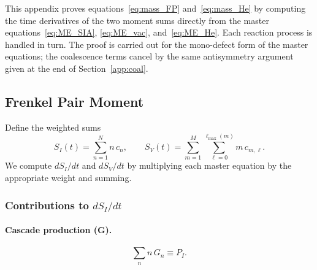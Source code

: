 This appendix proves equations~\eqref{eq:mass_FP} and~\eqref{eq:mass_He}
by computing the time derivatives of the two moment sums directly from the
master equations~\eqref{eq:ME_SIA}, \eqref{eq:ME_vac}, and~\eqref{eq:ME_He}.
Each reaction process is handled in turn. The proof is carried out for the
mono-defect form of the master equations; the coalescence terms cancel
by the same antisymmetry argument given at the end of
Section~\ref{app:coal}.

\subsection{Frenkel Pair Moment}
\label{app:FP}

Define the weighted sums
\begin{equation}\label{eq:SI_SV}
    S_I(t) = \sum_{n=1}^{N} n\,c_n,
    \qquad
    S_V(t) = \sum_{m=1}^{M}\sum_{\ell=0}^{\ell_{\max}(m)} m\,c_{m,\ell}.
\end{equation}
We compute $dS_I/dt$ and $dS_V/dt$ by multiplying each master equation by
the appropriate weight and summing.

\subsubsection*{Contributions to $dS_I/dt$}

\paragraph{Cascade production (G).}
\begin{equation}
    \sum_n n\,G_n \equiv P_I.
\end{equation}

